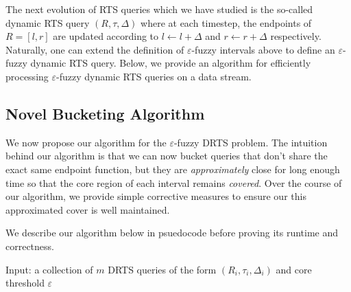The next evolution of RTS queries which we have studied is the so-called dynamic RTS query $(R, \tau, \Delta)$ where at each timestep, the endpoints of $R = [l, r]$ are updated according to $l \leftarrow l + \Delta$ and $r\leftarrow r+ \Delta$ respectively. Naturally, one can extend the definition of $\varepsilon$-fuzzy intervals above to define an $\varepsilon$-fuzzy dynamic RTS query. Below, we provide an algorithm for efficiently processing $\varepsilon$-fuzzy dynamic RTS queries on a data stream.

\subsection{Novel Bucketing Algorithm}
We now propose our algorithm for the $\varepsilon$-fuzzy DRTS problem. The intuition behind our algorithm is that we can now bucket queries that don't share the exact same endpoint function, but they are \textit{approximately} close for long enough time so that the core region of each interval remains \textit{covered}. Over the course of our algorithm, we provide simple corrective measures to ensure our this approximated cover is well maintained. 

We describe our algorithm below in psuedocode before proving its runtime and correctness. 


Input: a collection of $m$ DRTS queries of the form $(R_i, \tau_i, \Delta_i)$ and core threshold $\varepsilon$

